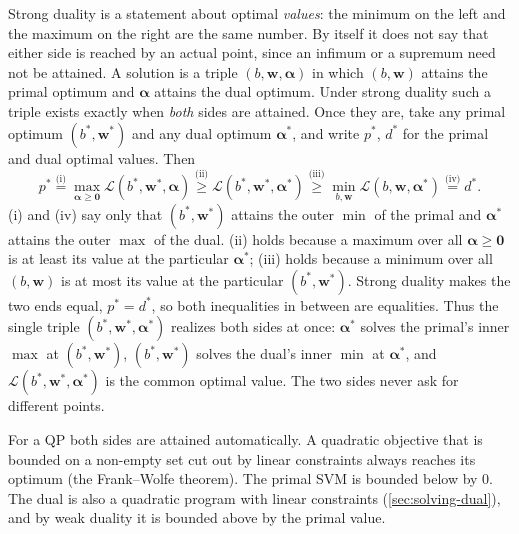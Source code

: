 \begin{remark}
    Strong duality is a statement about optimal \emph{values}: the minimum on
    the left and the maximum on the right are the same number. By itself it
    does not say that either side is reached by an actual point, since an
    infimum or a supremum need not be attained. A 
    solution is a triple \((b, \bm{w}, \bm{\alpha})\) in which \((b,
    \bm{w})\) attains the primal optimum and \(\bm{\alpha}\) attains the dual
    optimum. Under strong duality such a triple exists exactly when
    \emph{both} sides are attained. Once they are, take any primal optimum
    \((b^*, \bm{w}^*)\) and any dual optimum \(\bm{\alpha}^*\), and write
    \(p^*\), \(d^*\) for the primal and dual optimal values. Then
    \[
        p^*
        \overset{\text{(i)}}{=}
        \max_{\bm{\alpha} \ge \bm{0}} \mathcal{L}(b^*, \bm{w}^*, \bm{\alpha})
        \overset{\text{(ii)}}{\ge}
        \mathcal{L}(b^*, \bm{w}^*, \bm{\alpha}^*)
        \overset{\text{(iii)}}{\ge}
        \min_{b, \bm{w}} \mathcal{L}(b, \bm{w}, \bm{\alpha}^*)
        \overset{\text{(iv)}}{=}
        d^*.
    \]
    (i) and (iv) say only that \((b^*, \bm{w}^*)\) attains the outer
    \(\min\) of the primal and \(\bm{\alpha}^*\) attains the outer \(\max\)
    of the dual. (ii) holds because a maximum over all \(\bm{\alpha} \ge
    \bm{0}\) is at least its value at the particular \(\bm{\alpha}^*\); (iii)
    holds because a minimum over all \((b, \bm{w})\) is at most its value at
    the particular \((b^*, \bm{w}^*)\). Strong duality makes the two ends
    equal, \(p^* = d^*\), so both inequalities in between are equalities.
    Thus the single triple \((b^*, \bm{w}^*, \bm{\alpha}^*)\) realizes both
    sides at once: \(\bm{\alpha}^*\) solves the primal's inner \(\max\) at
    \((b^*, \bm{w}^*)\), \((b^*, \bm{w}^*)\) solves the dual's inner
    \(\min\) at \(\bm{\alpha}^*\), and \(\mathcal{L}(b^*, \bm{w}^*,
    \bm{\alpha}^*)\) is the common optimal value. The two sides never ask
    for different points.

    For a QP both sides are attained automatically. A quadratic objective
    that is bounded on a non-empty set cut out by linear constraints always
    reaches its optimum (the Frank--Wolfe theorem). The primal SVM is bounded
    below by \(0\). The dual is also a quadratic program with linear
    constraints (\autoref{sec:solving-dual}), and by weak duality it is
    bounded above by the primal value.
\end{remark}

